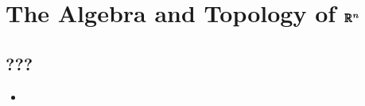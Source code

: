 \documentclass[../notes.tex]{subfiles}
\begin{document}
\chapter{The Algebra and Topology of \texorpdfstring{$\pmb{\mathbb{R}}^{\bm{n}}$}{TEXT}}
\section{???}
\begin{itemize}
    \item {}
\end{itemize}
\end{document}
